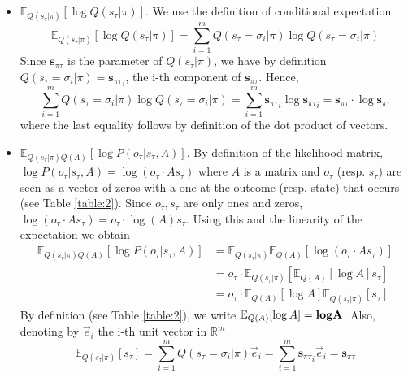 \documentclass[review,12pt,authoryear]{elsarticle}
\newcommand{\R}{\mathbb R}
\newcommand{\E}{\mathbb E}
\begin{document}
\begin{itemize}
    \item $\E_{Q(s_\tau |\pi)}[\log Q(s_\tau |\pi)]$. We use the definition of conditional expectation
    \begin{equation*}
        \E_{Q(s_\tau |\pi)}[\log Q(s_\tau |\pi)]= \sum_{i=1}^m Q(s_\tau =\sigma_i |\pi) \log Q(s_\tau =\sigma_i |\pi)
    \end{equation*}
    Since $\mathbf s_{\pi \tau}$ is the parameter of $Q(s_\tau |\pi)$, we have by definition $Q(s_\tau = \sigma_i|\pi)={\mathbf s_{\pi \tau}}_i$, the i-th component of $\mathbf s_{\pi \tau}$. Hence,
    \begin{equation*}
        \sum_{i=1}^m Q(s_\tau =\sigma_i |\pi) \log Q(s_\tau =\sigma_i |\pi) = \sum_{i=1}^m{\mathbf s_{\pi \tau}}_i \log {\mathbf s_{\pi \tau}}_i = \mathbf s_{\pi \tau} \cdot \log \mathbf s_{\pi \tau}
    \end{equation*}
    where the last equality follows by definition of the dot product of vectors.
    \item $\E_{Q(s_\tau |\pi)Q(A)}[\log P(o_{\tau}|s_{\tau},A)]$. By definition of the likelihood matrix, $\log P(o_{\tau}|s_{\tau},A)= \log(o_\tau \cdot A s_\tau)$ where $A$ is a matrix and $o_\tau$ (resp. $s_\tau$) are seen as a vector of zeros with a one at the outcome (resp. state) that occurs (see Table \ref{table:2}). Since $o_\tau, s_\tau$ are only ones and zeros, $\log (o_\tau \cdot A s_\tau)=o_\tau \cdot \log(A) s_\tau$. Using this and the linearity of the expectation we obtain
    \begin{equation*}
    \begin{split}
        \E_{Q(s_\tau |\pi)Q(A)}[\log P(o_{\tau}|s_{\tau},A)] &= \E_{Q(s_\tau|\pi)}\E_{Q(A)}[\log (o_\tau \cdot A s_\tau)] \\
        &= o_\tau \cdot \E_{Q(s_\tau|\pi)}\left[\E_{Q(A)}[\log A] s_\tau\right] \\
        &=o_\tau \cdot \E_{Q(A)}[\log A] \E_{Q(s_\tau|\pi)}\left[s_\tau\right]
    \end{split}
    \end{equation*}
    By definition (see Table \ref{table:2}), we write $\E_{Q(A)}[\log A]=\textbf{log} \bold A$. Also, denoting by $\vec e_i$ the i-th unit vector in $\R^m$
    \begin{equation*}
        \E_{Q(s_\tau|\pi)}\left[s_\tau\right] = \sum_{i=1}^m Q(s_\tau= \sigma_i|\pi) \vec e_i =\sum_{i=1}^m {\mathbf s_{\pi \tau}}_i \vec e_i = \mathbf s_{\pi \tau}
    \end{equation*}

\end{itemize}
\end{document}
